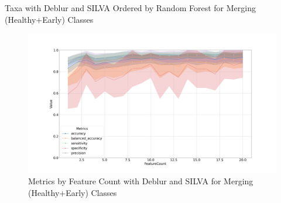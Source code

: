 \documentclass[a4paper]{article}
\begin{document}
            \begin{table}[p]
                \centering
                \caption{Taxa with Deblur and SILVA Ordered by Random Forest for Merging (Healthy+Early) Classes}
                \label{tb:RF-HE-Deblur-silva}

            \end{table}

            \begin{figure}[p]
                \centering
                \includegraphics[width=0.7 \linewidth]{figures/RandomForest/one.Deblur.silva/metrics.png}
                \caption{Metrics by Feature Count with Deblur and SILVA for Merging (Healthy+Early) Classes}
                \label{fig:RF-HE-metrics-Deblur-silva}
            \end{figure}
\end{document}
